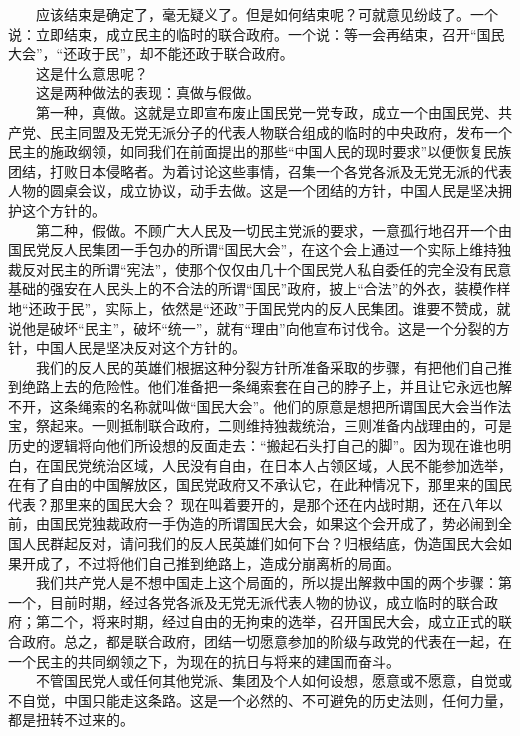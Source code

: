 \documentclass[cn,11pt,chinese]{elegantbook}
\begin{document}
　　应该结束是确定了，毫无疑义了。但是如何结束呢？可就意见纷歧了。一个说：立即结束，成立民主的临时的联合政府。一个说：等一会再结束，召开“国民大会”，“还政于民”，却不能还政于联合政府。\\
　　这是什么意思呢？\\
　　这是两种做法的表现：真做与假做。\\
　　第一种，真做。这就是立即宣布废止国民党一党专政，成立一个由国民党、共产党、民主同盟及无党无派分子的代表人物联合组成的临时的中央政府，发布一个民主的施政纲领，如同我们在前面提出的那些“中国人民的现时要求”以便恢复民族团结，打败日本侵略者。为着讨论这些事情，召集一个各党各派及无党无派的代表人物的圆桌会议，成立协议，动手去做。这是一个团结的方针，中国人民是坚决拥护这个方针的。\\
　　第二种，假做。不顾广大人民及一切民主党派的要求，一意孤行地召开一个由国民党反人民集团一手包办的所谓“国民大会”，在这个会上通过一个实际上维持独裁反对民主的所谓“宪法”，使那个仅仅由几十个国民党人私自委任的完全没有民意基础的强安在人民头上的不合法的所谓“国民”政府，披上“合法”的外衣，装模作样地“还政于民”，实际上，依然是“还政”于国民党内的反人民集团。谁要不赞成，就说他是破坏“民主”，破坏“统一”，就有“理由”向他宣布讨伐令。这是一个分裂的方针，中国人民是坚决反对这个方针的。\\
　　我们的反人民的英雄们根据这种分裂方针所准备采取的步骤，有把他们自己推到绝路上去的危险性。他们准备把一条绳索套在自己的脖子上，并且让它永远也解不开，这条绳索的名称就叫做“国民大会”。他们的原意是想把所谓国民大会当作法宝，祭起来。一则抵制联合政府，二则维持独裁统治，三则准备内战理由的，可是历史的逻辑将向他们所设想的反面走去：“搬起石头打自己的脚”。因为现在谁也明白，在国民党统治区域，人民没有自由，在日本人占领区域，人民不能参加选举，在有了自由的中国解放区，国民党政府又不承认它，在此种情况下，那里来的国民代表？那里来的国民大会？ 现在叫着要开的，是那个还在内战时期，还在八年以前，由国民党独裁政府一手伪造的所谓国民大会，如果这个会开成了，势必闹到全国人民群起反对，请问我们的反人民英雄们如何下台？归根结底，伪造国民大会如果开成了，不过将他们自己推到绝路上，造成分崩离析的局面。\\
　　我们共产党人是不想中国走上这个局面的，所以提出解救中国的两个步骤：第一个，目前时期，经过各党各派及无党无派代表人物的协议，成立临时的联合政府；第二个，将来时期，经过自由的无拘束的选举，召开国民大会，成立正式的联合政府。总之，都是联合政府，团结一切愿意参加的阶级与政党的代表在一起，在一个民主的共同纲领之下，为现在的抗日与将来的建国而奋斗。\\
　　不管国民党人或任何其他党派、集团及个人如何设想，愿意或不愿意，自觉或不自觉，中国只能走这条路。这是一个必然的、不可避免的历史法则，任何力量，都是扭转不过来的。\\
\end{document}
